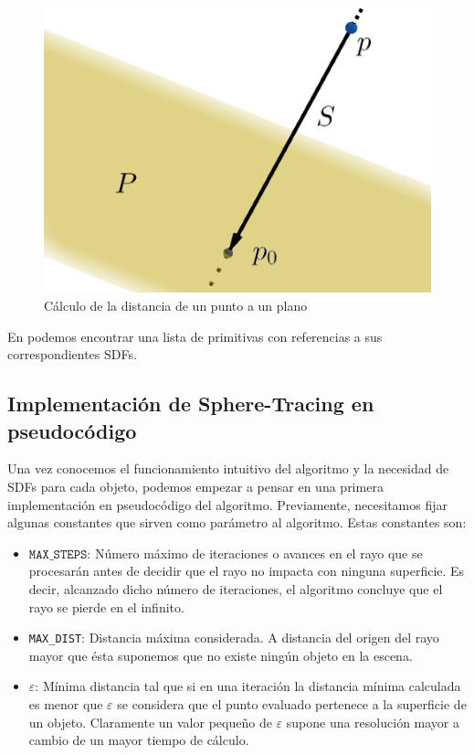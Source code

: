 \begin{figure} [ht]
    \centering
    \includegraphics[scale = 0.4]{img/C9/SDF-plano.png}
    \caption{Cálculo de la distancia de un punto a un plano}
    \label{fig:SDF-plano}
\end{figure}

En \cite[Table 1]{Hart-1995} podemos encontrar una lista de primitivas con referencias a sus correspondientes SDFs.

\newpage

\subsection{Implementación de Sphere-Tracing en pseudocódigo}

Una vez conocemos el funcionamiento intuitivo del algoritmo y la necesidad de SDFs para cada objeto, podemos empezar a pensar en una primera implementación en pseudocódigo del algoritmo. Previamente, necesitamos fijar algunas constantes que sirven como parámetro al algoritmo. Estas constantes son:
\begin{itemize}
    \item $\mathtt{MAX\_STEPS}$: Número máximo de iteraciones o avances en el rayo que se procesarán antes de decidir que el rayo no impacta con ninguna superficie. Es decir, alcanzado dicho número de iteraciones, el algoritmo concluye que el rayo se pierde en el infinito.
    \item \texttt{MAX\_DIST}: Distancia máxima considerada. A distancia del origen del rayo mayor que ésta suponemos que no existe ningún objeto en la escena.
    \item $\varepsilon$: Mínima distancia tal que si en una iteración la distancia mínima calculada es menor que $\varepsilon$ se considera que el punto evaluado pertenece a la superficie de un objeto. Claramente un valor pequeño de $\varepsilon$ supone una resolución mayor a cambio de un mayor tiempo de cálculo.
\end{itemize}

